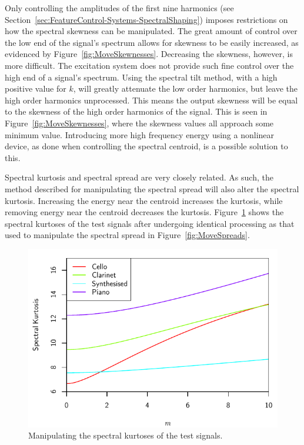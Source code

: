 			Only controlling the amplitudes of the first nine harmonics (see
			Section~\ref{sec:FeatureControl-Systems-SpectralShaping}) imposes restrictions on how the spectral
			skewness can be manipulated. The great amount of control over the low end of the signal's spectrum
			allows for skewness to be easily increased, as evidenced by Figure~\ref{fig:MoveSkewnesses}.
			Decreasing the skewness, however, is more difficult. The excitation system does not provide such
			fine control over the high end of a signal's spectrum.  Using the spectral tilt method, with a high
			positive value for $k$, will greatly attenuate the low order harmonics, but leave the high order
			harmonics unprocessed. This means the output skewness will be equal to the skewness of the high
			order harmonics of the signal. This is seen in Figure~\ref{fig:MoveSkewnesses}, where the skewness
			values all approach some minimum value.  Introducing more high frequency energy using a nonlinear
			device, as done when controlling the spectral centroid, is a possible solution to this.

			Spectral kurtosis and spectral spread are very closely related. As such, the method described for
			manipulating the spectral spread will also alter the spectral kurtosis. Increasing the energy near
			the centroid increases the kurtosis, while removing energy near the centroid decreases the
			kurtosis.  Figure~\ref{fig:MoveKurtoses} shows the spectral kurtoses of the test signals after
			undergoing identical processing as that used to manipulate the spectral spread in
			Figure~\ref{fig:MoveSpreads}.
			
			\begin{figure}[h!]
				\centering
				\includegraphics{chapter6/Images/MoveKurtoses.pdf}
				\caption{Manipulating the spectral kurtoses of the test signals.}
				\label{fig:MoveKurtoses}
			\end{figure}

